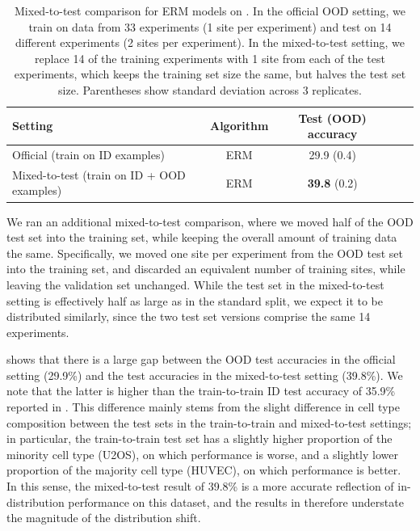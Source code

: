 \begin{table}[!t]
  \caption{Mixed-to-test comparison for ERM models on \RxRx.
  In the official OOD setting, we train on data from 33 experiments (1 site per experiment) and test on 14 different experiments (2 sites per experiment).
  In the mixed-to-test setting, we replace 14 of the training experiments with 1 site from each of the test experiments, which keeps the training set size the same, but halves the test set size.
  Parentheses show standard deviation across 3 replicates.
  }
  \label{tab:drop_rxrx1}
  \centering
  \begin{tabular}{lcccc}
  \toprule
  Setting & Algorithm & Test (OOD) accuracy\\
  \midrule
  Official      (train on ID examples)         & ERM & 29.9 (0.4)\\
  Mixed-to-test (train on ID + OOD examples)   & ERM & \textbf{39.8} (0.2) \\
  \bottomrule
  \end{tabular}
\end{table}

We ran an additional mixed-to-test comparison, where we moved half of the OOD test set into the training set, while keeping the overall amount of training data the same.
Specifically, we moved one site per experiment from the OOD test set into the training set, and discarded an equivalent number of training sites, while leaving the validation set unchanged.
While the test set in the mixed-to-test setting is effectively half as large as in the standard split, we expect it to be distributed similarly, since the two test set versions comprise the same 14 experiments.

 shows that there is a large gap between the OOD test accuracies in the official setting (29.9\%) and the test accuracies in the mixed-to-test setting (39.8\%).
We note that the latter is higher than the train-to-train ID test accuracy of 35.9\% reported in .
This difference mainly stems from the slight difference in cell type composition between the test sets in the train-to-train and mixed-to-test settings; in particular, the train-to-train test set has a slightly higher proportion of the minority cell type (U2OS), on which performance is worse, and a slightly lower proportion of the majority cell type (HUVEC), on which performance is better.
In this sense, the mixed-to-test result of 39.8\% is a more accurate reflection of in-distribution performance on this dataset, and the results in  therefore understate the magnitude of the distribution shift.


